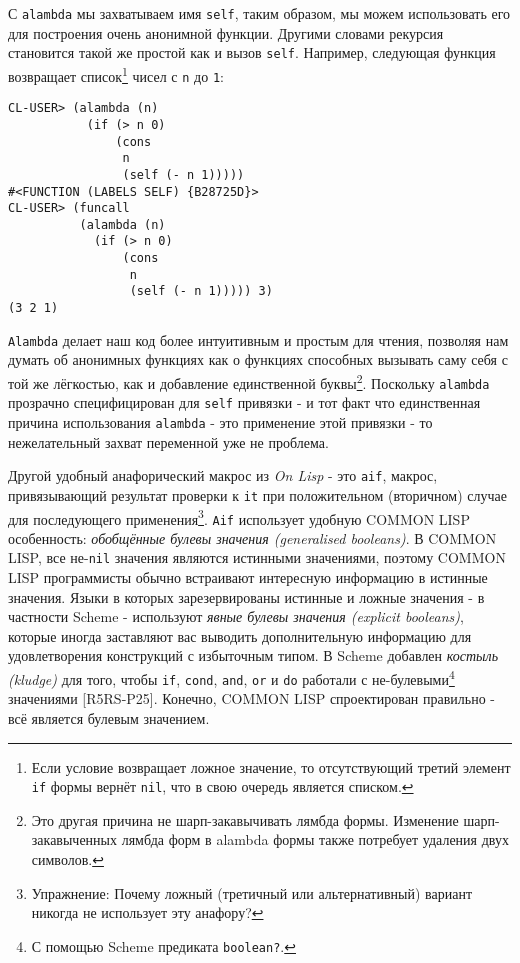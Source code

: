 С \verb"alambda" мы захватываем имя \verb"self", таким образом, мы можем использовать его для построения очень анонимной функции. Другими словами рекурсия становится такой же простой как и вызов \verb"self". Например, следующая функция возвращает список\footnote{Если условие возвращает ложное значение, то отсутствующий третий элемент \verb"if" формы вернёт \verb"nil", что в свою очередь является списком.} чисел с \verb"n" до \verb"1":


\begin{verbatim}
CL-USER> (alambda (n)
           (if (> n 0)
               (cons
                n
                (self (- n 1)))))
#<FUNCTION (LABELS SELF) {B28725D}>
CL-USER> (funcall 
          (alambda (n)
            (if (> n 0)
                (cons
                 n
                 (self (- n 1))))) 3)
(3 2 1)
\end{verbatim}


\verb"Alambda" делает наш код более интуитивным и простым для чтения, позволяя нам думать об анонимных функциях как о функциях способных вызывать саму себя с той же лёгкостью, как и добавление единственной буквы\footnote{Это другая причина не шарп-закавычивать лямбда формы. Изменение шарп-закавыченных лямбда форм в alambda формы также потребует удаления двух символов.}. Поскольку \verb"alambda" прозрачно специфицирован для \verb"self" привязки - и тот факт что единственная причина использования \verb"alambda" - это применение этой привязки - то нежелательный захват переменной уже не проблема.



Другой удобный анафорический макрос из \emph{On Lisp} - это \verb"aif", макрос, привязывающий результат проверки к \verb"it" при положительном (вторичном) случае для последующего применения\footnote{Упражнение: Почему ложный (третичный или альтернативный) вариант никогда не использует эту анафору?}. \verb"Aif" использует удобную COMMON LISP особенность: \emph{обобщённые булевы значения (generalised booleans)}. В COMMON LISP, все не-\verb"nil" значения являются истинными значениями, поэтому COMMON LISP программисты обычно встраивают интересную информацию в истинные значения. Языки в которых зарезервированы истинные и ложные значения - в частности Scheme - используют \emph{явные булевы значения (explicit booleans)}, которые иногда заставляют вас выводить дополнительную информацию для удовлетворения конструкций с избыточным типом. В Scheme добавлен \emph{костыль (kludge)} для того, чтобы \verb"if", \verb"cond", \verb"and", \verb"or" и \verb"do" работали с не-булевыми\footnote{С помощью Scheme предиката \verb"boolean?".} значениями [R5RS-P25]. Конечно, COMMON LISP спроектирован правильно - всё является булевым значением.



